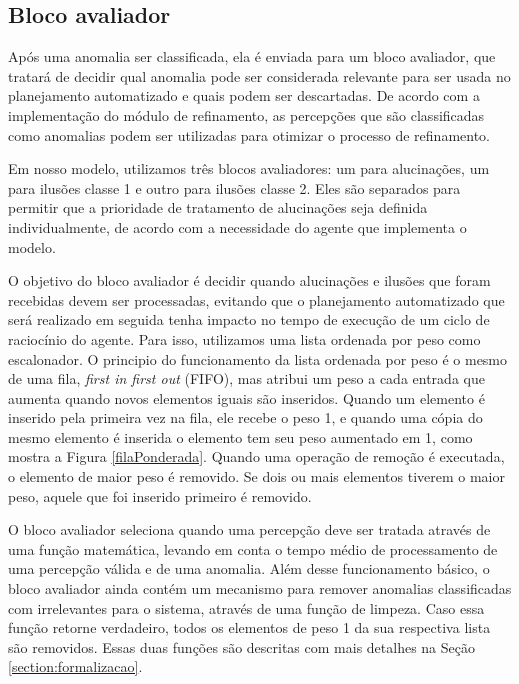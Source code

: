 \subsection{Bloco avaliador}

Após uma anomalia ser classificada, ela é enviada para um bloco avaliador, que tratará de decidir qual anomalia pode ser considerada relevante para ser usada no planejamento automatizado e quais podem ser descartadas. De acordo com a implementação do módulo de refinamento, as percepções que são classificadas como anomalias podem ser utilizadas para otimizar o processo de refinamento.

Em nosso modelo, utilizamos três blocos avaliadores: um para alucinações, um para ilusões classe 1 e outro para ilusões classe 2. Eles são separados para permitir que a prioridade de tratamento de alucinações seja definida individualmente, de acordo com a necessidade do agente que implementa o modelo.

O objetivo do bloco avaliador é decidir quando alucinações e ilusões que foram recebidas devem ser processadas, evitando que o planejamento automatizado que será realizado em seguida tenha impacto no tempo de execução de um ciclo de raciocínio do agente. Para isso, utilizamos uma lista ordenada por peso como escalonador. O principio do funcionamento da lista ordenada por peso é o mesmo de uma fila, \textit{first in first out} (FIFO), mas atribui um peso a cada entrada que aumenta quando novos elementos iguais são inseridos. Quando um elemento é inserido pela primeira vez na fila, ele recebe o peso 1, e quando uma cópia do mesmo elemento é inserida o elemento tem seu peso aumentado em 1, como mostra a Figura \ref{filaPonderada}. Quando uma operação de remoção é executada, o elemento de maior peso é removido. Se dois ou mais elementos tiverem o maior peso, aquele que foi inserido primeiro é removido.

O bloco avaliador seleciona quando uma percepção deve ser tratada através de uma função matemática, levando em conta o tempo médio de processamento de uma percepção válida e de uma anomalia. Além desse funcionamento básico, o bloco avaliador ainda contém um mecanismo para remover anomalias classificadas com irrelevantes para o sistema, através de uma função de limpeza. Caso essa função retorne verdadeiro, todos os elementos de peso 1 da sua respectiva lista são removidos. Essas duas funções são descritas com mais detalhes na Seção \ref{section:formalizacao}.

